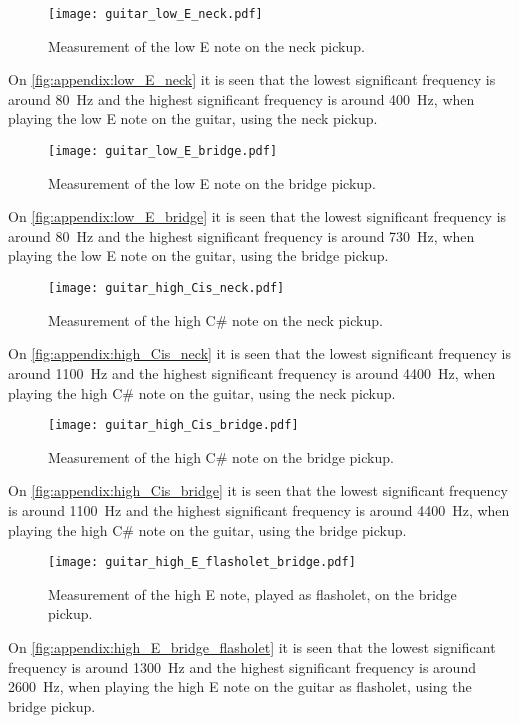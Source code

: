 \begin{figure}[htbp!]
	\centering
		\texttt{[image: guitar\_low\_E\_neck.pdf]}
		\caption{Measurement of the low E note on the neck pickup.}
		\label{fig:appendix:low_E_neck}
\end{figure}

On  \autoref{fig:appendix:low_E_neck} it is seen that the lowest significant frequency is around \SI{80}{\hertz} and the highest significant frequency is around \SI{400}{\hertz}, when playing the low E note on the guitar, using the neck pickup.

\begin{figure}[htbp!]
	\centering
		\texttt{[image: guitar\_low\_E\_bridge.pdf]}
		\caption{Measurement of the low E note on the bridge pickup.}
		\label{fig:appendix:low_E_bridge}
\end{figure}

On  \autoref{fig:appendix:low_E_bridge} it is seen that the lowest significant frequency is around \SI{80}{\hertz} and the highest significant frequency is around \SI{730}{\hertz}, when playing the low E note on the guitar, using the bridge pickup.

\begin{figure}[htbp!]
	\centering
		\texttt{[image: guitar\_high\_Cis\_neck.pdf]}
		\caption{Measurement of the high C\# note on the neck pickup.}
		\label{fig:appendix:high_Cis_neck}
\end{figure}

On  \autoref{fig:appendix:high_Cis_neck} it is seen that the lowest significant frequency is around \SI{1100}{\hertz} and the highest significant frequency is around \SI{4400}{\hertz}, when playing the high C\# note on the guitar, using the neck pickup.

\begin{figure}[htbp!]
	\centering
		\texttt{[image: guitar\_high\_Cis\_bridge.pdf]}
		\caption{Measurement of the high C\# note on the bridge pickup.}
		\label{fig:appendix:high_Cis_bridge}
\end{figure}

On  \autoref{fig:appendix:high_Cis_bridge} it is seen that the lowest significant frequency is around \SI{1100}{\hertz} and the highest significant frequency is around \SI{4400}{\hertz}, when playing the high C\# note on the guitar, using the bridge pickup. 

\begin{figure}[htbp!]
	\centering
		\texttt{[image: guitar\_high\_E\_flasholet\_bridge.pdf]}
		\caption{Measurement of the high E note, played as flasholet, on the bridge pickup.}
		\label{fig:appendix:high_E_bridge_flasholet}
\end{figure}

On  \autoref{fig:appendix:high_E_bridge_flasholet} it is seen that the lowest significant frequency is around \SI{1300}{\hertz} and the highest significant frequency is around \SI{2600}{\hertz}, when playing the high E note on the guitar as flasholet, using the bridge pickup. 
